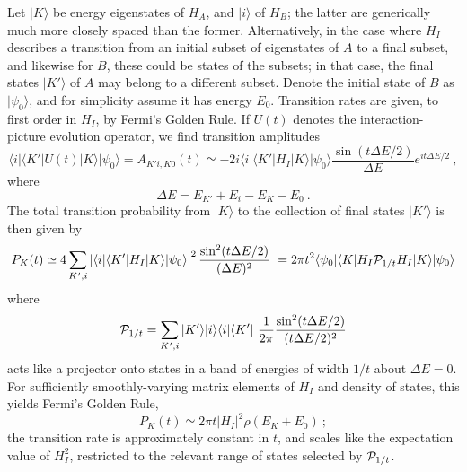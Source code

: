 \documentclass[aps,prd,groupedaddress,nofootinbib,letterpaper]{revtex4}
\newcommand{\calp}{{\cal P}}
\newcommand{\beq}{\begin{equation}}
\newcommand{\eeq}{\end{equation}}
\begin{document}
Let $|K\rangle$ be energy eigenstates of $H_A$, and $|i\rangle$ of $H_B$; the latter are generically much more closely spaced than the former.  Alternatively, in the case where $H_I$ describes a transition from an initial subset of eigenstates of $A$ to a final subset, and likewise for $B$, these could be states of the subsets; in that case, the final states $|K'\rangle$ of $A$ may belong to a different subset.  Denote the initial state of $B$ as $|\psi_0\rangle$, and for simplicity assume it has energy $E_0$.  Transition rates are given, to first order in $H_I$, by Fermi's Golden Rule.  If $U(t)$ denotes the interaction-picture evolution operator, we find transition amplitudes
\beq\label{pertamp}
\langle i\vert\langle K'\vert U(t)  |K\rangle |\psi_0\rangle = A_{K'i,K0}(t) \simeq -2i \langle i\vert\langle K'| H_I  |K\rangle |\psi_0\rangle \frac{\sin(t\Delta E/2)}{\Delta E} e^{it\Delta E /2}\ ,
\eeq
where 
\beq
\Delta E = E_{K'} + E_i - E_K - E_0\ .
\eeq
The total transition probability from $|K\rangle$ to the collection of final states $|K'\rangle$ is then given by 
\beq\label{Ptrans}
P_K(t) \simeq 4\sum_{K',i} \left|\langle i\vert\langle K'| H_I  |K\rangle|\psi_0\rangle\right|^2 \frac{\sin^2(t\Delta E/2)}{(\Delta E)^2}\ = 2\pi t^2  \langle\psi_0|\langle K| H_I \calp_{1/t} H_I  |K\rangle|\psi_0\rangle
\eeq
where
\beq
\calp_{1/t} =  \sum_{K',i}  |K'\rangle |i\rangle\langle i\vert\langle K'|\ \frac{1}{2\pi} \frac{ \sin^2(t\Delta E/2)}{  (t\Delta E/2)^2}
\eeq
acts like a projector onto states in a band of energies of width $1/t$ about $\Delta E=0$.  
For sufficiently smoothly-varying matrix elements of $H_I$ and density of states, this yields Fermi's Golden Rule, 
\beq\label{FGR}
P_K(t) \simeq 2\pi t|H_I|^2 \rho(E_K+E_0)\ ;
\eeq
the transition rate is approximately constant in $t$, and scales  like the expectation value of $H_I^2$, restricted to the relevant range of states selected by $\calp_{1/t}$.  
\end{document}
